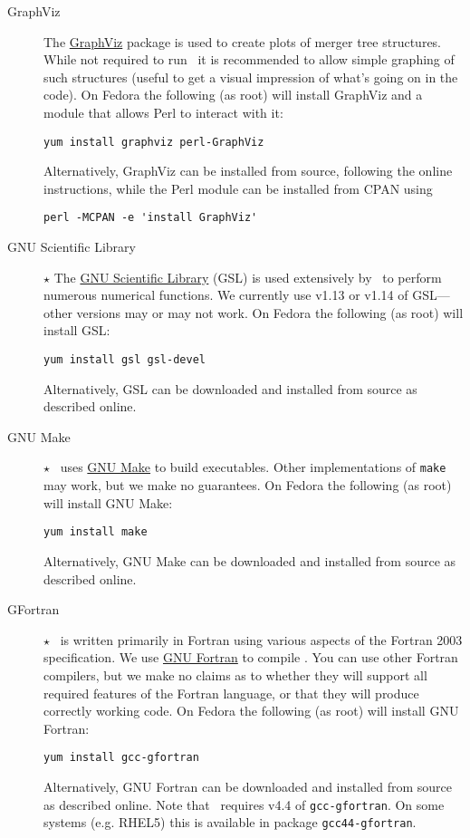 \begin{description}
\item[GraphViz] The \href{http://www.graphviz.org/}{GraphViz} package is used to create plots of merger tree structures. While not required to run \glc\ it is recommended to allow simple graphing of such structures (useful to get a visual impression of what's going on in the code). On Fedora the following (as root) will install GraphViz and a module that allows Perl to interact with it:
\begin{verbatim}
yum install graphviz perl-GraphViz
\end{verbatim}
Alternatively, GraphViz can be installed from source, following the online instructions, while the Perl module can be installed from CPAN using
\begin{verbatim}
perl -MCPAN -e 'install GraphViz'
\end{verbatim}

 \item [GNU Scientific Library] $\star$ The \href{http://www.gnu.org/software/gsl/}{GNU Scientific Library} (GSL) is used extensively by \glc\ to perform numerous numerical functions. We currently use v1.13 or v1.14 of GSL---other versions may or may not work. On Fedora the following (as root) will install GSL:
\begin{verbatim}
yum install gsl gsl-devel
\end{verbatim}
Alternatively, GSL can be downloaded and installed from source as described online.

 \item [GNU Make] $\star$ \glc\ uses \href{http://www.gnu.org/software/make/}{GNU Make} to build executables. Other implementations of {\tt make} may work, but we make no guarantees. On Fedora the following (as root) will install GNU Make:
\begin{verbatim}
yum install make
\end{verbatim}
Alternatively, GNU Make can be downloaded and installed from source as described online.

 \item [GFortran] $\star$ \glc\ is written primarily in Fortran using various aspects of the Fortran 2003 specification. We use \href{http://gcc.gnu.org/fortran/}{GNU Fortran} to compile \glc. You can use other Fortran compilers, but we make no claims as to whether they will support all required features of the Fortran language, or that they will produce correctly working code. On Fedora the following (as root) will install GNU Fortran:
\begin{verbatim}
yum install gcc-gfortran
\end{verbatim}
Alternatively, GNU Fortran can be downloaded and installed from source as described online. Note that \glc\ requires v4.4 of {\tt gcc-gfortran}. On some systems (e.g. RHEL5) this is available in package {\tt gcc44-gfortran}.


\end{description}
